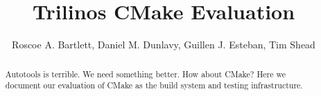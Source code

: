 \documentclass[pdf,ps2pdf,11pt]{SANDreport}
\title{
Trilinos CMake Evaluation
}
\author{Roscoe A. Bartlett, Daniel M. Dunlavy, Guillen J. Esteban, Tim Shead}
\date{}
\begin{document}
\raggedright

\maketitle

%

%
\begin{abstract}
%
Autotools is terrible. We need something better.  How about CMake?
Here we document our evaluation of CMake as the build system and
testing infrastructure.
%
\end{abstract}
%

%
%
%

%
\tableofcontents


\end{document}
